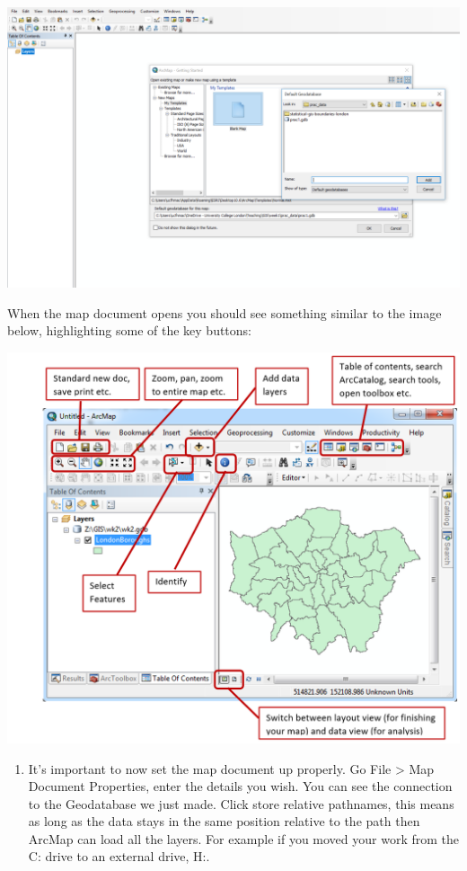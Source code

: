 \documentclass[]{book}
\providecommand{\tightlist}{%
  \setlength{\itemsep}{0pt}\setlength{\parskip}{0pt}}
\begin{document}
\begin{center}\includegraphics[width=800pt]{prac1_images/default_database} \end{center}

When the map document opens you should see something similar to the image below, highlighting some of the key buttons:

\begin{center}\includegraphics[width=500pt]{prac1_images/arcmap} \end{center}

\begin{enumerate}
\def\labelenumi{\arabic{enumi}.}
\setcounter{enumi}{3}
\tightlist
\item
  It's important to now set the map document up properly. Go File \textgreater{} Map Document Properties, enter the details you wish. You can see the connection to the Geodatabase we just made. Click store relative pathnames, this means as long as the data stays in the same position relative to the path then ArcMap can load all the layers. For example if you moved your work from the C: drive to an external drive, H:.
\end{enumerate}
\end{document}
